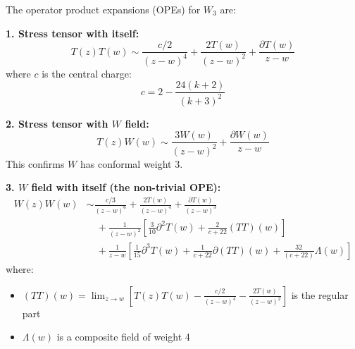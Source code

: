 \begin{theorem}
\label{thm:w3-ope-structure-complete}
The operator product expansions (OPEs) for $W_3$ are:

\textbf{1. Stress tensor with itself:}
\begin{equation}
T(z) T(w) \sim \frac{c/2}{(z-w)^4} + \frac{2T(w)}{(z-w)^2} + \frac{\partial T(w)}{z-w}
\end{equation}
where $c$ is the central charge:
\begin{equation}
c = 2 - \frac{24(k+2)}{(k+3)^2}
\end{equation}

\textbf{2. Stress tensor with $W$ field:}
\begin{equation}
T(z) W(w) \sim \frac{3W(w)}{(z-w)^2} + \frac{\partial W(w)}{z-w}
\end{equation}
This confirms $W$ has conformal weight 3.

\textbf{3. $W$ field with itself (the non-trivial OPE):}
\begin{align}
W(z) W(w) &\sim \frac{c/3}{(z-w)^6} + \frac{2T(w)}{(z-w)^4} + \frac{\partial T(w)}{(z-w)^3}\\
&\quad + \frac{1}{(z-w)^2}\left[\frac{3}{10}\partial^2 T(w) + \frac{2}{c+22}(TT)(w)\right]\\
&\quad + \frac{1}{z-w}\left[\frac{1}{15}\partial^3 T(w) + \frac{1}{c+22}\partial(TT)(w) 
+ \frac{32}{(c+22)}\Lambda(w)\right]
\end{align}
where:
\begin{itemize}
\item $(TT)(w) = \lim_{z \to w}[T(z)T(w) - \frac{c/2}{(z-w)^4} - \frac{2T(w)}{(z-w)^2}]$ 
is the regular part
\item $\Lambda(w)$ is a composite field of weight 4
\end{itemize}
\end{theorem}

